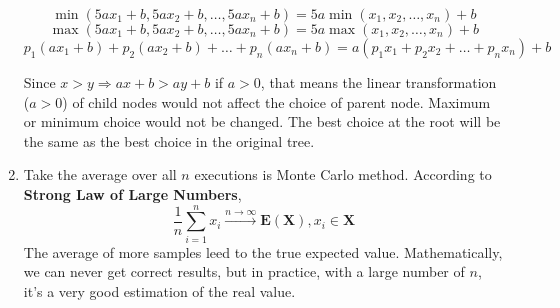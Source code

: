 \documentclass{article}
\begin{document}
\begin{enumerate}
$$\min(5ax_1+b,5ax_2+b,\dots,5ax_n+b) = 5a\min(x_1,x_2,\dots,x_n)+b$$
$$\max(5ax_1+b,5ax_2+b,\dots,5ax_n+b) = 5a\max(x_1,x_2,\dots,x_n)+b$$
$$p_1(ax_1+b)+p_2(ax_2+b)+\dots+p_n(ax_n+b) = a(p_1x_1+p_2x_2+\dots+p_nx_n)+b$$

Since $x>y \Rightarrow ax+b>ay+b$ if $a>0$, that means the linear transformation ($a>0$) of child nodes would not affect the choice of parent node. Maximum or minimum choice would not be changed. 
The best choice at the root will be the same as the best choice in the original tree.

\item

Take the average over all $n$ executions is Monte Carlo method. According to \textbf{Strong Law of Large Numbers},
$$\frac{1}{n}\sum_{i=1}^n x_i \xrightarrow[]{n\rightarrow\infty} \mathbf{E}(\mathbf{X}), x_i\in\mathbf{X}$$
The average of more samples leed to the true expected value.
Mathematically, we can never get correct results, but in practice, with a large number of $n$, it's a very good estimation of 
the real value.

\end{enumerate}
\end{document}
